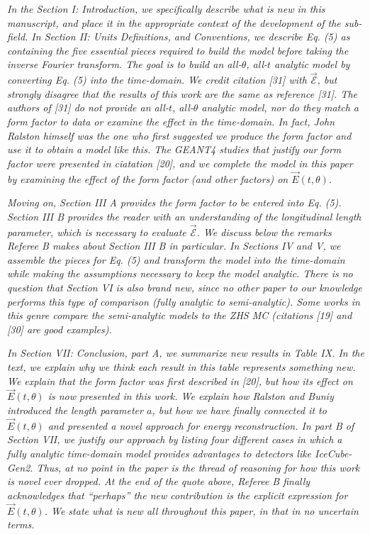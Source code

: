 \documentclass[12pt]{article}
\begin{document}
\textit{In the Section I: Introduction, we specifically describe what is new in this manuscript, and place it in the appropriate context of the development of the sub-field.  In Section II: Units Definitions, and Conventions, we describe Eq. (5) as containing the five essential pieces required to build the model before taking the inverse Fourier transform.  The goal is to build an all-$\theta$, all-$t$ analytic model by converting Eq. (5) into the time-domain.  We credit citation [31] with $\vec{\mathcal{E}}$, but strongly disagree that the results of this work are the same as reference [31].  The authors of [31] do not provide an all-$t$, all-$\theta$ analytic model, nor do they match a form factor to data or examine the effect in the time-domain.  In fact, John Ralston himself was the one who first suggested we produce the form factor and use it to obtain a model like this.  The GEANT4 studies that justify our form factor were presented in ciatation [20], and we complete the model in this paper by examining the effect of the form factor (and other factors) on $\vec{E}(t,\theta)$.}

\textit{Moving on, Section III A provides the form factor to be entered into Eq. (5).  Section III B provides the reader with an understanding of the longitudinal length parameter, which is necessary to evaluate $\vec{\mathcal{E}}$.  We discuss below the remarks Referee B makes about Section III B in particular.  In Sections IV and V, we assemble the pieces for Eq. (5) and transform the model into the time-domain while making the assumptions necessary to keep the model analytic.  There is no question that Section VI is also brand new, since no other paper to our knowledge performs this type of comparison (fully analytic to semi-analytic).  Some works in this genre compare the semi-analytic models to the ZHS MC (citations [19] and [30] are good examples).}

\textit{In Section VII: Conclusion, part A, we summarize new results in Table IX.  In the text, we explain why we think each result in this table represents something new.  We explain that the form factor was first described in [20], but how its effect on $\vec{E}(t,\theta)$ is now presented in this work.  We explain how Ralston and Buniy introduced the length parameter $a$, but how we have finally connected it to $\vec{E}(t,\theta)$ and presented a novel approach for energy reconstruction.  In part B of Section VII, we justify our approach by listing four different cases in which a fully analytic time-domain model provides advantages to detectors like IceCube-Gen2.  Thus, at no point in the paper is the thread of reasoning for how this work is novel ever dropped.  At the end of the quote above, Referee B finally acknowledges that ``perhaps'' the new contribution is the explicit expression for $\vec{E}(t,\theta)$.  We state what is new all throughout this paper, in that in no uncertain terms.}
\end{document}
